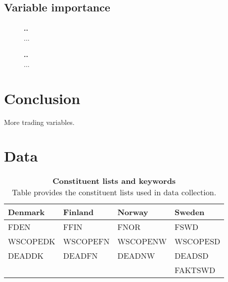 \documentclass{article}
\begin{document}
\subsection{Variable importance}\label{VariableImportance}

\begin{figure}[h]
\centering
\caption[Variable importance]{\textbf{..}\\ ...}

\label{plot:combined_VI}
\end{figure}

\begin{figure}[h]
\centering
\caption[Relative variable importance]{\textbf{..}\\ ...}

\label{plot:relative_VI}
\end{figure}

\section{Conclusion}\label{Conclusion}
More trading variables.

\clearpage

\appendix
\section{Data}
\renewcommand{\thefigure}{A.\arabic{figure}}
\setcounter{figure}{0}
\renewcommand{\thetable}{A.\arabic{table}}
\setcounter{table}{0}

\begin{table}[ht] 
\small
\caption[Constituent lists and keywords]{\textbf{Constituent lists and keywords}\\ Table provides the constituent lists used in data collection.}
 \label{table:constituteLists}
\centering
\begin{tabularx}{\textwidth}{X X X X}
\toprule
Denmark & Finland & Norway & Sweden \\
\midrule
FDEN 		&  FFIN		& FNOR		& FSWD\\
WSCOPEDK & WSCOPEFN & WSCOPENW& WSCOPESD\\
DEADDK 	&   DEADFN 	& DEADNW 	& DEADSD\\
& & & FAKTSWD\\
 \bottomrule
 \end{tabularx}
 \end{table} 
\end{document}
